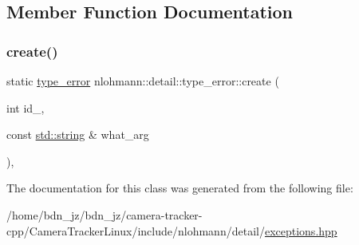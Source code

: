 \subsection{Member Function Documentation}
\mbox{\label{classnlohmann_1_1detail_1_1type__error_aecc083aea4b698c33d042670ba50c10f}} 
\subsubsection{\texorpdfstring{create()}{create()}}
{\footnotesize\ttfamily static \hyperlink{classnlohmann_1_1detail_1_1type__error}{type\+\_\+error} nlohmann\+::detail\+::type\+\_\+error\+::create (\begin{DoxyParamCaption}\item[{int}]{id\+\_\+,  }\item[{const \hyperlink{namespacenlohmann_1_1detail_a1ed8fc6239da25abcaf681d30ace4985ab45cffe084dd3d20d928bee85e7b0f21}{std\+::string} \&}]{what\+\_\+arg }\end{DoxyParamCaption})\hspace{0.3cm}{\ttfamily [inline]}, {\ttfamily [static]}}



The documentation for this class was generated from the following file\+:\begin{DoxyCompactItemize}
\item 
/home/bdn\+\_\+jz/bdn\+\_\+jz/camera-\/tracker-\/cpp/\+Camera\+Tracker\+Linux/include/nlohmann/detail/\hyperlink{exceptions_8hpp}{exceptions.\+hpp}\end{DoxyCompactItemize}
